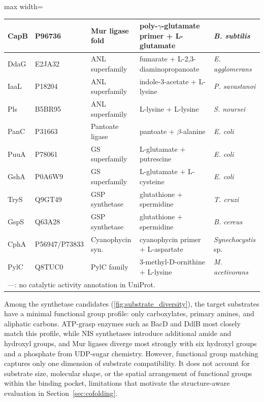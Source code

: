 \documentclass[12pt]{article}
\begin{document}
\begin{table}[H]
\begin{adjustbox}{max width=\textwidth}
\begin{tabular}{lllll}
CapB & P96736 & Mur ligase fold & poly-$\gamma$-glutamate primer + L-glutamate & \textit{B. subtilis} \\
\midrule
DdaG & E2JA32 & ANL superfamily & fumarate + L-2,3-diaminopropanoate & \textit{E. agglomerans} \\
IaaL & P18204 & ANL superfamily & indole-3-acetate + L-lysine & \textit{P. savastanoi} \\
Pls & B5BR95 & ANL superfamily & L-lysine + L-lysine & \textit{S. noursei} \\
\midrule
PanC & P31663 & Pantoate ligase & pantoate + $\beta$-alanine & \textit{E. coli} \\
\midrule
PuuA & P78061 & GS superfamily & L-glutamate + putrescine & \textit{E. coli} \\
GshA & P0A6W9 & GS superfamily & L-glutamate + L-cysteine & \textit{E. coli} \\
\midrule
TryS & Q9GT49 & GSP synthetase & glutathione + spermidine & \textit{T. cruzi} \\
GspS & Q63A28 & GSP synthetase & glutathione + spermidine & \textit{B. cereus} \\
\midrule
CphA & P56947/P73833 & Cyanophycin syn. & cyanophycin primer + L-aspartate & \textit{Synechocystis} sp. \\
\midrule
PylC & Q8TUC0 & PylC family & 3-methyl-D-ornithine + L-lysine & \textit{M. acetivorans} \\
\bottomrule
\multicolumn{5}{l}{\footnotesize ---: no catalytic activity annotation in UniProt.} \\
\end{tabular}
\end{adjustbox}
\end{table}

Among the synthetase candidates (\autoref{fig:substrate_diversity}), the target substrates have a minimal functional group profile: only carboxylates, primary amines, and aliphatic carbons. ATP-grasp enzymes such as BacD and DdlB most closely match this profile, while NIS synthetases introduce additional amide and hydroxyl groups, and Mur ligases diverge most strongly with six hydroxyl groups and a phosphate from UDP-sugar chemistry. However, functional group matching captures only one dimension of substrate compatibility. It does not account for substrate size, molecular shape, or the spatial arrangement of functional groups within the binding pocket, limitations that motivate the structure-aware evaluation in Section~\ref{sec:cofolding}.
\end{document}

